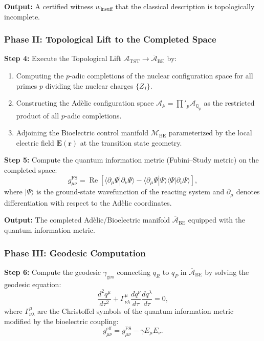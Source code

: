 \documentclass[11pt,openany]{extbook}
\theoremstyle{plain}
\theoremstyle{definition}
\begin{document}
\noindent \textbf{Output:} A certified witness $w_{\mathrm{insuff}}$ that the classical description is topologically incomplete.

\subsubsection{Phase II: Topological Lift to the Completed Space}

\noindent \textbf{Step 4:} Execute the Topological Lift $\mathcal{A}_{\mathrm{TST}} \to \overline{\mathcal{A}}_{\mathrm{BE}}$ by:
\begin{enumerate}
\item Computing the $p$-adic completions of the nuclear configuration space for all primes $p$ dividing the nuclear charges $\{Z_I\}$.
\item Constructing the Adèlic configuration space $\mathcal{A}_{\mathbb{A}} = \prod'_{p} \mathcal{A}_{\mathbb{Q}_p}$ as the restricted product of all $p$-adic completions.
\item Adjoining the Bioelectric control manifold $\mathcal{M}_{\mathrm{BE}}$ parameterized by the local electric field $\mathbf{E}(\mathbf{r})$ at the transition state geometry.
\end{enumerate}

\noindent \textbf{Step 5:} Compute the quantum information metric (Fubini--Study metric) on the completed space:
\[
g_{\mu\nu}^{\mathrm{FS}} = \operatorname{Re}\!\left[\langle \partial_\mu \Psi | \partial_\nu \Psi \rangle - \langle \partial_\mu \Psi | \Psi \rangle \langle \Psi | \partial_\nu \Psi \rangle\right],
\]
where $|\Psi\rangle$ is the ground-state wavefunction of the reacting system and $\partial_\mu$ denotes differentiation with respect to the Adèlic coordinates.

\noindent \textbf{Output:} The completed Adèlic/Bioelectric manifold $\overline{\mathcal{A}}_{\mathrm{BE}}$ equipped with the quantum information metric.

\subsubsection{Phase III: Geodesic Computation}

\noindent \textbf{Step 6:} Compute the geodesic $\gamma_{\mathrm{geo}}$ connecting $q_R$ to $q_P$ in $\overline{\mathcal{A}}_{\mathrm{BE}}$ by solving the geodesic equation:
\[
\frac{d^2 q^\mu}{d\tau^2} + \Gamma^{\mu}_{\nu\lambda} \frac{dq^\nu}{d\tau} \frac{dq^\lambda}{d\tau} = 0,
\]
where $\Gamma^{\mu}_{\nu\lambda}$ are the Christoffel symbols of the quantum information metric modified by the bioelectric coupling:
\[
g_{\mu\nu}^{\mathrm{eff}} = g_{\mu\nu}^{\mathrm{FS}} - \gamma E_\mu E_\nu.
\]
\end{document}
